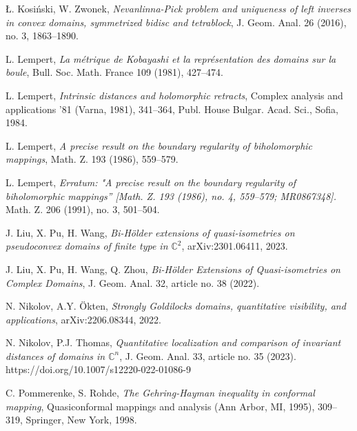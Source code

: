 \documentclass[a4paper,12pt]{amsart}
\theoremstyle{remark}\newtheorem{remark}[theorem]{Remark}
\begin{document}
\begin{thebibliography}{}
\L. Kosi\'nski, W. Zwonek,
{\it Nevanlinna-Pick problem and uniqueness of left inverses in convex domains, symmetrized bidisc and tetrablock},
J. Geom. Anal. 26 (2016), no. 3, 1863--1890. 
		
 L. Lempert, {\it La m\'etrique de Kobayashi et la repr\'esentation des domains sur la boule}, Bull. Soc. Math. France 109 (1981), 427--474.
		
 L. Lempert, {\it Intrinsic distances and holomorphic retracts}, Complex analysis and applications '81 (Varna, 1981), 341--364, Publ. House Bulgar. Acad. Sci., Sofia, 1984. 

 L. Lempert, {\it A precise result on the boundary regularity of biholomorphic mappings}, Math. Z. 193 (1986), 559--579.

 L. Lempert, {\it Erratum: "A precise result on the boundary regularity of biholomorphic mappings'' [Math. Z. 193 (1986), no. 4, 559–579; MR0867348].} Math. Z. 206 (1991), no. 3, 501--504.

 J. Liu, X. Pu, H. Wang, 
 {\it Bi-H\"older extensions of quasi-isometries on pseudoconvex domains of finite type in 
 $\mathbb C^2$}, arXiv:2301.06411, 2023.

 J. Liu, X. Pu, H. Wang, Q. Zhou, {\it Bi-H\"older Extensions of Quasi-isometries on Complex Domains}, J. Geom. Anal. 32, article no. 38 (2022). 

  N. Nikolov, A.Y. \"Okten, {\it Strongly Goldilocks domains, quantitative visibility, and applications}, arXiv:2206.08344, 2022.
  
N. Nikolov, P.J. Thomas, {\it Quantitative localization and comparison of invariant distances of domains in $\mathbb C^n$}, J. Geom. Anal. 33, article no. 35 (2023). 
https://doi.org/10.1007/s12220-022-01086-9

  C. Pommerenke, S. Rohde, 
{\it The Gehring-Hayman inequality in conformal mapping}, Quasiconformal mappings and analysis (Ann Arbor, MI, 1995), 309--319, Springer, New York, 1998. 

\end{thebibliography}
	
\end{document}
